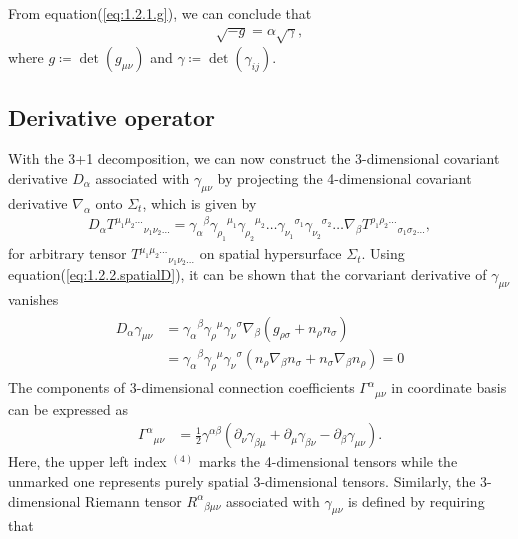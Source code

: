 From equation(\ref{eq:1.2.1.g}), we can conclude that
\begin{align}
    \sqrt{-g} = \alpha \sqrt{\gamma},
\end{align}
where $g \coloneqq \det{\left(g_{\mu\nu}\right)}$ and $\gamma \coloneqq \det{\left(\gamma_{ij}\right)}$.

\subsection{Derivative operator} \label{section1.2.2}
With the 3+1 decomposition, we can now construct the 3-dimensional covariant derivative $D_\alpha$ associated with $\gamma_{\mu\nu}$ by projecting the 4-dimensional covariant derivative $\nabla_\alpha$ onto $\Sigma_t$, which is given by
\begin{align}\label{eq:1.2.2.spatialD}
    D_{\alpha} T^{\mu_1 \mu_2 \dots}{}_{\nu_1 \nu_2 \dots} = \gamma_{\alpha}{}^{\beta}\gamma_{\rho_1}{}^{\mu_1} \gamma_{\rho_2}{}^{\mu_2} \dots \gamma_{\nu_1}{}^{\sigma_1} \gamma_{\nu_2}{}^{\sigma_2} \dots \nabla_{\beta} T^{\rho_1 \rho_2 \dots}{}_{\sigma_1 \sigma_2 \dots},
\end{align}
for arbitrary tensor $T^{\mu_1 \mu_2 \dots}{}_{\nu_1 \nu_2 \dots}$ on spatial hypersurface $\Sigma_t$.
Using equation(\ref{eq:1.2.2.spatialD}), it can be shown that the corvariant derivative of $\gamma_{\mu\nu}$ vanishes
\begin{align}
\begin{split}
    D_{\alpha} \gamma_{\mu\nu} &= \gamma_{\alpha}{}^{\beta} \gamma_{\rho}{}^{\mu} \gamma_{\nu}{}^{\sigma} \nabla_{\beta} \left(g_{\rho\sigma} + n_\rho n_\sigma \right) \\
    &= \gamma_{\alpha}{}^{\beta} \gamma_{\rho}{}^{\mu} \gamma_{\nu}{}^{\sigma} \left( n_\rho \nabla_\beta n_\sigma + n_\sigma \nabla_\beta n_\rho \right) = 0
\end{split}
\end{align}
The components of 3-dimensional connection coefficients $\Gamma^{\alpha}{}_{\mu\nu}$ in coordinate basis can be expressed as
\begin{align}\label{eq:3_connection}
    \Gamma^{\alpha}{}_{\mu\nu} &= \frac{1}{2} \gamma^{\alpha\beta} \left( \partial_{\nu}\gamma_{\beta\mu} + \partial_{\mu}\gamma_{\beta\nu} - \partial_{\beta}\gamma_{\mu\nu} \right).
\end{align}
Here, the upper left index ${}^{(4)}$ marks the 4-dimensional tensors while the unmarked one represents purely spatial 3-dimensional tensors.
Similarly, the 3-dimensional Riemann tensor $R^{\alpha}{}_{\beta\mu\nu}$ associated with $\gamma_{\mu\nu}$ is defined by requiring that
